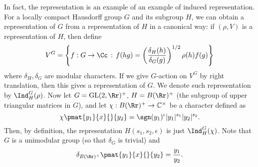 \documentclass{article}
\newcommand{\GL}{\mathrm{GL}}
\begin{document}
In fact, the representation is an example of an example of induced representation. 
For a locally compact Hausdorff group $G$ and its subgroup $H$, we can obtain a representation of $G$ from a representation of $H$ in a canonical way: if $(\rho, V)$ is a representation of $H$, then define 
$$
V^{G} = \left\{f:G\to \Cc\,:\, f(hg) = \left( \frac{\delta_{H}(h)}{\delta_{G}(g)}\right)^{1/2}\rho(h)f(g)\right\}
$$
where $\delta_{H}, \delta_{G}$ are modular characters. If we give $G$-action on $V^{G}$ by right translation, then this gives a representation of $G$. We denote such representation by $\Ind_{H}^{G} (\rho)$. 
Now let $G = \GL(2, \Rr)^{+}$, $H = B(\Rr)^{+}$ (the subgroup of upper triangular matrices in $G$), and let $\chi:B(\Rr)^{+}\to \mathbb{C}^{\times}$ be a character defined as 
$$
\chi\pmat{y_{1}}{x}{}{y_{2}} = \sgn(y_{1})^{\epsilon}|y_{1}|^{s_{1}}|y_{2}|^{s_{2}}.
$$
Then, by definition, the representation $H(s_{1}, s_{2}, \epsilon)$ is just $\Ind_{H}^{G}(\chi)$. 
Note that $G$ is a unimodular group (so that $\delta_{G}$ is trivial) and 
$$
\delta_{B(\Rr)^{+}} \pmat{y_{1}}{x}{}{y_{2}} = \frac{y_{1}}{y_{2}}. 
$$
\end{document}
